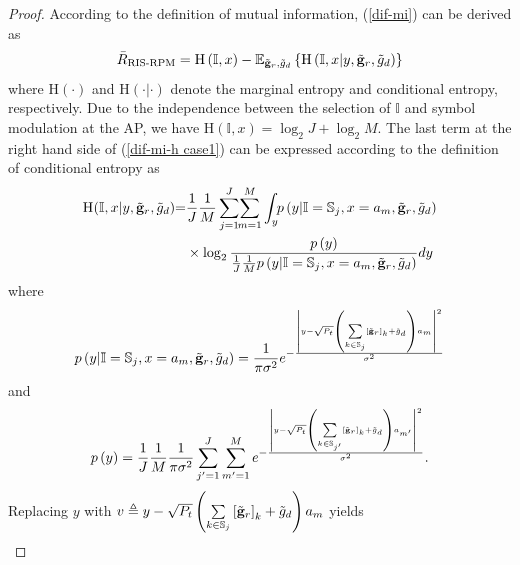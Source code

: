 \documentclass[draftclsnofoot,onecolumn,12pt]{IEEEtran}
\begin{document}
\begin{proof}
	According to the definition of mutual information, (\ref{dif-mi}) can be derived as
	\begin{align}\label{dif-mi-h case1}
	\bar{R}_\text{RIS-RPM}=\text{H}\left(\mathbb{I},x\right)-\mathbb{E}_{\tilde{\bf g}_r,\tilde{g}_d}\left\{\text{H}\left(\mathbb{I},x|y,\tilde{\bf g}_r,\tilde{ g}_d\right)\right\}
	\end{align}
	where $\text{H}\left(\cdot\right)$ and $\text{H}\left(\cdot| \cdot \right)$ denote the marginal entropy and conditional entropy, respectively. 
	Due to the independence between the selection of ${\mathbb I}$ and symbol modulation at the AP, we have $\text{H}\left(\mathbb{I},x\right)=\log_2{J}+\log_2 M$. 
	The last term at the right hand side of (\ref{dif-mi-h case1}) can be expressed according to the definition of conditional entropy as
	\begin{align}\label{entropy1 case1}
	\text{H}\hspace{-0.05cm}\left(\mathbb{I},x|y,\tilde{\bf g}_r,\tilde{ g}_d\right)
	\hspace{-0.1cm}=&\frac{1}{J}\frac{1}{M}\sum_{j=1}^{J}\hspace{-0.1cm}\sum_{m=1}^{M}\int_y \hspace{-0.1cm} p\left(y|\mathbb{I}=\mathbb{S}_j,x=a_m,\tilde{\bf g}_r,\tilde{ g}_d\right)\notag\\
	&\times\log_2\frac{ p\left(y\right)}{ \frac{1}{{J}}\frac{1}{M} p\left(y|\mathbb{I}=\mathbb{S}_j,x=a_m,\tilde{\bf g}_r,\tilde{ g}_d\right)}dy
	\end{align}
	where 
	\begin{align}\label{pdf1 case1}
	p\left(y|\mathbb{I}=\mathbb{S}_j,x=a_m,\tilde{\bf g}_r,\tilde{ g}_d\right)=\frac{1}{\pi \sigma^2}e^{-\frac{\left|y-\sqrt{P_t} \left(\sum\limits_{k\in \mathbb{S}_j} \left[{\tilde{\bf g}}_r\right]_k + {\tilde{g}}_d\right)a_m\right|^2}{\sigma^2}}
	\end{align}
	and 
	\begin{align}\label{pdf2 case1}
	p\left(y\right)=\frac{1}{{J}}\frac{1}{M}\frac{1}{\pi \sigma^2}\sum_{j'=1}^{J}\sum_{m'=1}^{M}e^{-\frac{\left|y-\sqrt{P_t}\left(\sum\limits_{k\in \mathbb{S}_{j'}} \left[{\tilde{\bf g}}_r\right]_k + {\tilde{g}}_d\right)a_{m'} \right|^2}{\sigma^2}}.
	\end{align}
	Replacing $y$ with $v\triangleq y-\sqrt{P_t} \left(\sum\limits_{k\in \mathbb{S}_j} \left[{\tilde{\bf g}}_r\right]_k + {\tilde{g}}_d\right)a_m$ yields
	\begin{align}\label{part entropy case1}

\end{align}
\end{proof}
\end{document}
